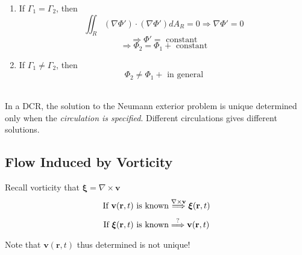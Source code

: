 \begin{itemize}
\begin{enumerate}[label = (\arabic*)]
\begin{enumerate}[label = (\roman*)]
\item If $\Gamma_1 = \Gamma_2$, then 
\[
\iint_R\left(\nabla\Phi'\right)\cdot\left(\nabla\Phi'\right)dA_R = 0\Longrightarrow\nabla\Phi' = 0
\]
\[
\Longrightarrow\Phi' = \text{ constant}
\]
\[
\Longrightarrow\Phi_2 = \Phi_1 + \text{ constant}
\]
\item If $\Gamma_1 \neq \Gamma_2$, then 
\[
\Phi_2 \neq \Phi_1 + \text{ in general}
\]
\end{enumerate}
\end{enumerate}
\begin{discussion}\mbox{}\\
In a DCR, the solution to the Neumann exterior problem is unique determined only when the \emph{circulation is specified}. Different circulations gives different solutions.
\end{discussion}
\end{itemize}
\subsection{Flow Induced by Vorticity}
Recall vorticity that $\boldsymbol{\xi} = \nabla\times\mathbf{v}$
\begin{align*}
\text{If }\mathbf{v}(\mathbf{r},t)\text{ is known}&\overset{\nabla\times\mathbf{v}}{\underset{}{\Longrightarrow}}\boldsymbol{\xi}(\mathbf{r},t) \\
\text{If }\boldsymbol{\xi}(\mathbf{r},t)\text{ is known}&\overset{?}{\underset{}{\Longrightarrow}}\mathbf{v}(\mathbf{r},t) 
\end{align*}
Note that $\mathbf{v}(\mathbf{r},t)$ thus determined is not unique!
